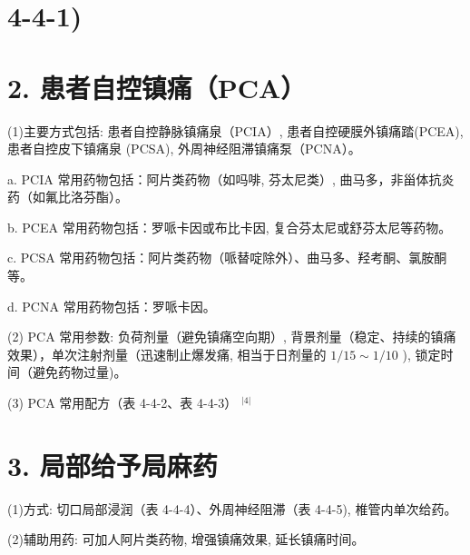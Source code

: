 \documentclass[10pt]{article}
\begin{document}
\section*{4-4-1)}
\section*{2. 患者自控镇痛（PCA）}
(1)主要方式包括: 患者自控静脉镇痛泉（PCIA）, 患者自控硬膜外镇痛踏(PCEA), 患者自控皮下镇痛泉 (PCSA), 外周神经阻滞镇痛泵（PCNA）。

a. PCIA 常用药物包括：阿片类药物（如吗啡, 芬太尼类）, 曲马多，非甾体抗炎药（如氟比洛芬酯）。

b. PCEA 常用药物包括：罗哌卡因或布比卡因, 复合芬太尼或舒芬太尼等药物。

c. PCSA 常用药物包括：阿片类药物（哌替啶除外）、曲马多、羟考酮、氯胺酮等。

d. PCNA 常用药物包括：罗哌卡因。

(2) PCA 常用参数: 负荷剂量（避免镇痛空向期）, 背景剂量（稳定、持续的镇痛效果），单次注射剂量（迅速制止爆发痛, 相当于日剂量的 $1 / 15 \sim 1 / 10$ ), 锁定时间（避免药物过量)。

(3) PCA 常用配方（表 4-4-2、表 4-4-3） ${ }^{|4|}$

\section*{3. 局部给予局麻药}
(1)方式: 切口局部浸润（表 4-4-4）、外周神经阻滞（表 4-4-5), 椎管内单次给药。

(2)辅助用药: 可加人阿片类药物, 增强镇痛效果, 延长镇痛时间。
\end{document}
